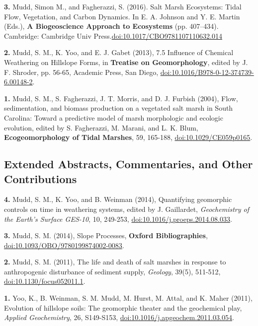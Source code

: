 \documentclass[10pt, a4paper]{article}
\newcommand{\years}[1]{\marginnote{\scriptsize #1}}
\begin{document}
\years{2016}\hangindent=0.7cm\textbf{3. }Mudd, Simon M., and Fagherazzi, S. (2016). Salt Marsh Ecosystems: Tidal Flow, Vegetation, and Carbon Dynamics. In E. A. Johnson and Y. E. Martin (Eds.), \textbf{A Biogeoscience Approach to Ecosystems} (pp. 407--434). Cambridge: Cambridge Univ Press.\href{https://doi.org/10.1017/CBO9781107110632.014}{doi:10.1017/CBO9781107110632.014}\par

\years{2013}\hangindent=0.7cm\textbf{2.} Mudd, S. M., K. Yoo, and E. J. Gabet (2013), 7.5 Influence of Chemical Weathering on Hillslope Forms, in \textbf{Treatise on Geomorphology}, edited by J. F. Shroder, pp. 56-65, Academic Press, San Diego, \href{http://dx.doi.org/doi:10.1016/B978-0-12-374739-6.00148-2}{doi:10.1016/B978-0-12-374739-6.00148-2}.\par

\years{2004}\hangindent=0.7cm\textbf{1.} Mudd, S. M., S. Fagherazzi, J. T. Morris, and D. J. Furbish (2004), Flow, sedimentation, and biomass production on a vegetated salt marsh in South Carolina: Toward a predictive model of marsh morphologic and ecologic evolution, edited by S. Fagherazzi, M. Marani, and L. K. Blum, \textbf{Ecogeomorphology of Tidal Marshes}, 59, 165-188, \href{http://dx.doi.org/doi:10.1029/CE059p0165}{doi:10.1029/CE059p0165}.\par

\subsection*{Extended Abstracts, Commentaries, and Other Contributions}
\noindent
\years{2014}\hangindent=0.7cm\textbf{4.} Mudd, S. M., K. Yoo, and B. Weinman (2014), Quantifying geomorphic controls on time in weathering systems, edited by J. Gaillardet, \textit{Geochemistry of the Earth's Surface GES-10}, 10, 249-253, \href{http://dx.doi.org/doi:10.1016/j.proeps.2014.08.033}{doi:10.1016/j.proeps.2014.08.033}.\par
\hangindent=0.7cm\textbf{3.} Mudd, S. M. (2014), Slope Processes, \textbf{Oxford Bibliographies}, \href{http://dx.doi.org/doi:10.1093/OBO/9780199874002-0083}{doi:10.1093/OBO/9780199874002-0083}.\par 
\years{2011}\hangindent=0.7cm\textbf{2.} Mudd, S. M. (2011), The life and death of salt marshes in response to anthropogenic disturbance of sediment supply, \textit{Geology}, 39(5), 511-512, \href{http://dx.doi.org/doi:10.1130/focus052011.1}{doi:10.1130/focus052011.1}.\par
\years{2009}\hangindent=0.7cm\textbf{1.} Yoo, K., B. Weinman, S. M. Mudd, M. Hurst, M. Attal, and K. Maher (2011), Evolution of hillslope soils: The geomorphic theater and the geochemical play, \textit{Applied Geochemistry}, 26, S149-S153, \href{http://dx.doi.org/doi:10.1016/j.apgeochem.2011.03.054}{doi:10.1016/j.apgeochem.2011.03.054}.\par

\vfill{}
\end{document}
